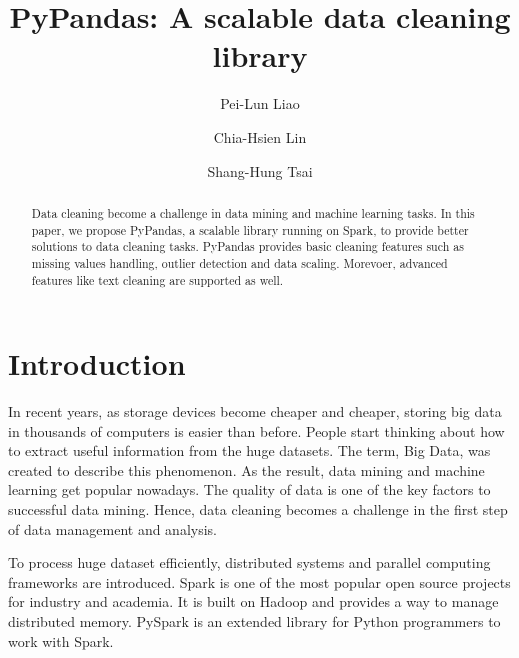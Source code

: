 \documentclass[sigconf]{acmart}
\begin{document}
\title{PyPandas: A scalable data cleaning library}

\author{Pei-Lun Liao}

\author{Chia-Hsien Lin}

\author{Shang-Hung Tsai}

\begin{abstract}
Data cleaning become a challenge\cite{datacleaning} in data mining and machine learning tasks. In this paper, we propose PyPandas, a scalable library running on Spark\cite{spark}, to provide better solutions to data cleaning tasks. PyPandas provides basic cleaning features such as missing values handling, outlier detection and data scaling. Morevoer, advanced features like text cleaning are supported as well.   

\end{abstract}

\maketitle

\section{Introduction}
In recent years, as storage devices become cheaper and cheaper, storing big data in thousands of computers is easier than before. People start thinking about how to extract useful information from the huge datasets. The term, Big Data, was created to describe this phenomenon\cite{bigdata}. As the result, data mining\cite{Han, MMD} and machine learning\cite{ml} get popular nowadays. The quality of data is one of the key factors to successful data mining\cite{dataquality}. Hence, data cleaning becomes a challenge in the first step of data management and analysis\cite{datacleaning, DBS-045, PW}.
	
To process huge dataset efficiently, distributed systems and parallel computing frameworks\cite{mapreduce, gfs, hadoop} are introduced. Spark\cite{spark} is one of the most popular open source projects for industry and academia. It is built on Hadoop\cite{hadoop} and provides a way to manage distributed memory. PySpark\cite{pyspark} is an extended library for Python programmers to work with Spark.
	
\end{document}
